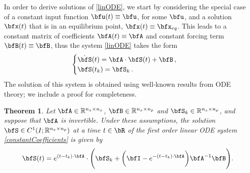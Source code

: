 \documentclass[DIV=12]{scrartcl} %
\newtheorem{theorem}{Theorem}
\theoremstyle{definition}
\begin{document}
In order to derive solutions of \eqref{linODE}, we start by considering the special case of a constant input function $\bfu (t) \equiv \bfu$, for some $\bfu$, and a solution $\bfx (t)$ that is in an equilibrium point, $\bfx (t) \equiv \bfx _{eq}$. This leads to a constant matrix of coefficients $\bfA(t)\equiv \bfA$ and constant forcing term $\bfB(t)\equiv \bfB$, 
thus the system \eqref{linODE} takes the form
\begin{equation}
\label{constantCoefficients}
    \begin{cases}
    \dot{\bfS}(t) = \bfA\cdot \bfS(t) + \bfB\,,\\
    \bfS(t_{k})=\bfS_{k}\,.
    \end{cases}
\end{equation}
The solution of this system is obtained using well-known results from ODE theory; we include a proof for completeness.
\begin{theorem}
\label{thm:constantMat}
    Let $\bfA\in\mathbb{R}^{n_x\times n_x}$, $\bfB\in\mathbb{R}^{n_x\times n_p}$ and $\bfS_k\in\mathbb{R}^{n_x\times n_p}$, and suppose that $\bfA$ is invertible. Under these assumptions, the solution $\bfS\in C^1(I;\mathbb{R}^{n_x\times n_p})$ at a time $t\in\bR$ of the first order linear ODE system \eqref{constantCoefficients} is given by 
    \begin{equation}
    \label{ssSolution}
    \bfS(t) = e^{(t-t_k)\cdot \bfA}\cdot \Biggl(\bfS_{k} +\biggl(\bfI-e^{-(t-t_k)\cdot \bfA}\biggr)\bfA^{-1}\bfB\Biggr).
\end{equation}
\end{theorem}
\end{document}
